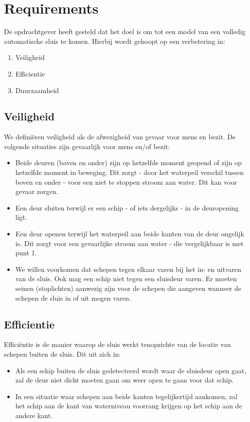 \documentclass{article} %
\begin{document}
\section{Requirements}
De opdrachtgever heeft gesteld dat het doel is om tot een model van een volledig automatische sluis te komen. Hierbij wordt gehoopt op een verbetering in:
\begin{enumerate}
    \item Veiligheid
    \item Efficientie
    \item Duurzaamheid
\end{enumerate}

\subsection{Veiligheid}
We definiëren veiligheid als de afwezigheid van gevaar voor mens en bezit. De volgende situaties zijn gevaarlijk voor mens en/of bezit:
\begin{itemize}
    \item Beide deuren (boven en onder) zijn op hetzelfde moment geopend of zijn op hetzelfde moment in beweging. Dit zorgt - door het waterpeil verschil tussen boven en onder - voor een niet te stoppen stroom aan water. Dit kan voor gevaar zorgen.
    \item Een deur sluiten terwijl er een schip - of iets dergelijks - in de deuropening ligt.
    \item Een deur openen terwijl het waterpeil aan beide kanten van de deur ongelijk is. Dit zorgt voor een gevaarlijke stroom aan water - die vergelijkbaar is met punt 1.
    \item We willen voorkomen dat schepen tegen elkaar varen bij het in- en uitvaren van de sluis. Ook mag een schip niet tegen een sluisdeur varen. Er moeten seinen (stoplichten) aanwezig zijn voor de schepen die aangeven wanneer de schepen de sluis in of uit mogen varen.
\end{itemize}

\subsection{Efficientie}
Efficiëntie is de manier waarop de sluis werkt tenopzichte van de locatie van schepen buiten de sluis. Dit uit zich in:
\begin{itemize}
    \item Als een schip buiten de sluis gedetecteerd wordt waar de sluisdeur open gaat, zal de deur niet dicht moeten gaan om weer open te gaan voor dat schip.
    \item In een situatie waar schepen aan beide kanten tegelijkertijd aankomen, zal het schip aan de kant van waterniveau voorrang krijgen op het schip aan de andere kant.
\end{itemize}
\end{document}
